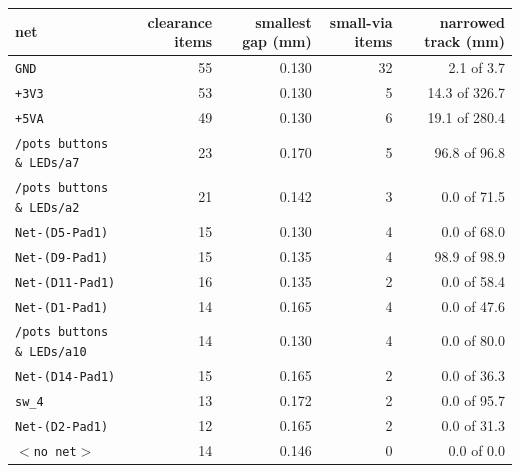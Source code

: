 \begin{tabular}{lrrrr}
\toprule
net & clearance items & smallest gap (mm) & small-via items & narrowed track (mm) \\
\midrule
\texttt{GND} & 55 & 0.130 & 32 & 2.1 of 3.7 \\
\texttt{+3V3} & 53 & 0.130 & 5 & 14.3 of 326.7 \\
\texttt{+5VA} & 49 & 0.130 & 6 & 19.1 of 280.4 \\
\texttt{/pots buttons \& LEDs/a7} & 23 & 0.170 & 5 & 96.8 of 96.8 \\
\texttt{/pots buttons \& LEDs/a2} & 21 & 0.142 & 3 & 0.0 of 71.5 \\
\texttt{Net-(D5-Pad1)} & 15 & 0.130 & 4 & 0.0 of 68.0 \\
\texttt{Net-(D9-Pad1)} & 15 & 0.135 & 4 & 98.9 of 98.9 \\
\texttt{Net-(D11-Pad1)} & 16 & 0.135 & 2 & 0.0 of 58.4 \\
\texttt{Net-(D1-Pad1)} & 14 & 0.165 & 4 & 0.0 of 47.6 \\
\texttt{/pots buttons \& LEDs/a10} & 14 & 0.130 & 4 & 0.0 of 80.0 \\
\texttt{Net-(D14-Pad1)} & 15 & 0.165 & 2 & 0.0 of 36.3 \\
\texttt{sw\_4} & 13 & 0.172 & 2 & 0.0 of 95.7 \\
\texttt{Net-(D2-Pad1)} & 12 & 0.165 & 2 & 0.0 of 31.3 \\
\texttt{$<$no net$>$} & 14 & 0.146 & 0 & 0.0 of 0.0 \\
\bottomrule
\end{tabular}
